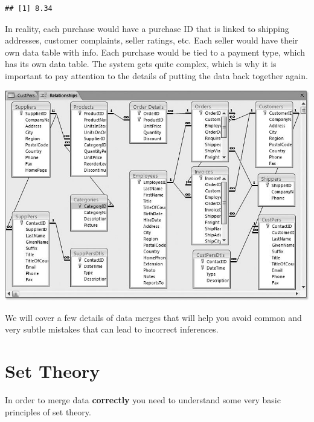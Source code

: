 \documentclass[]{book}
\newenvironment{Shaded}{\begin{snugshade}}{\end{snugshade}}
\newcommand{\KeywordTok}[1]{\textcolor[rgb]{0.13,0.29,0.53}{\textbf{#1}}}
\newcommand{\NormalTok}[1]{#1}
\newcommand{\OperatorTok}[1]{\textcolor[rgb]{0.81,0.36,0.00}{\textbf{#1}}}
\newcommand{\StringTok}[1]{\textcolor[rgb]{0.31,0.60,0.02}{#1}}
\theoremstyle{definition}
\theoremstyle{definition}
\theoremstyle{definition}
\theoremstyle{remark}
\begin{document}
\begin{Shaded}
\end{Shaded}

\begin{verbatim}
## [1] 8.34
\end{verbatim}

In reality, each purchase would have a purchase ID that is linked to
shipping addresses, customer complaints, seller ratings, etc. Each
seller would have their own data table with info. Each purchase would be
tied to a payment type, which has its own data table. The system gets
quite complex, which is why it is important to pay attention to the
details of putting the data back together again.

\includegraphics{figures/SampleRetailDatabase.png}

We will cover a few details of data merges that will help you avoid
common and very subtle mistakes that can lead to incorrect inferences.

\hypertarget{set-theory}{%
\section{Set Theory}\label{set-theory}}

In order to merge data \textbf{correctly} you need to understand some
very basic principles of set theory.
\end{document}

